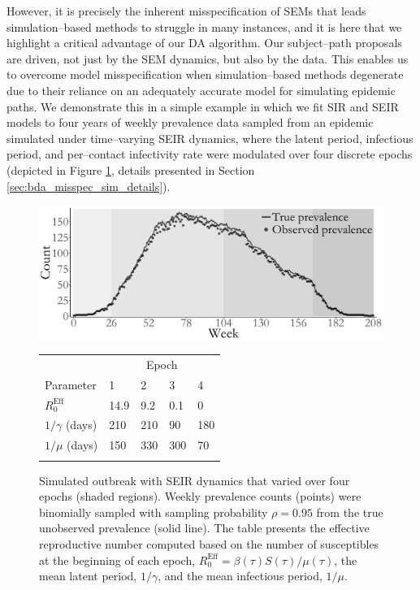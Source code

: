 However, it is precisely the inherent misspecification of SEMs that leads simulation--based methods to struggle in many instances, and it is here that we highlight a critical advantage of our DA algorithm. Our subject--path proposals are driven, not just by the SEM dynamics, but also by the data. This enables us to overcome model misspecification when simulation--based methods degenerate due to their reliance on an adequately accurate model for simulating epidemic paths. We demonstrate this in a simple example in which we fit SIR and SEIR models to four years of weekly prevalence data sampled from an epidemic simulated under time--varying SEIR dynamics, where the latent period, infectious period, and per--contact infectivity rate were modulated over four discrete epochs (depicted in Figure \ref{fig:misspec_data}, details presented in Section \ref{sec:bda_misspec_sim_details}).

\setcounter{table}{1}
\begin{figure}[!ht]
	\centering
	\includegraphics[width=0.5\linewidth]{figures/SEIR_misspec_data.pdf}
	\qquad
	\begin{tabular}[b]{lllll}
		& \multicolumn{4}{c}{Epoch}\\ \cmidrule{2-5}
		Parameter & 1 & 2 & 3 & 4 \\ \hline	
		$ R_0^{\mathrm{Eff}} $ & 14.9& 9.2& 0.1& 0\\
		$ 1/\gamma $ (days) & 210&210&90& 180\\
		$ 1/\mu $ (days) & 150 &330&300&70	\\
		&&&&
	\end{tabular}
	\captionsetup{labelformat=andtable}
	\caption{Simulated outbreak with SEIR dynamics that varied over four epochs (shaded regions). Weekly prevalence counts (points) were binomially sampled with sampling probability $ \rho = 0.95 $ from the true unobserved prevalence (solid line). The table presents the effective reproductive number computed based on the number of susceptibles at the beginning of each epoch, $ R_0^{\mathrm{Eff}} = \beta(\tau) S(\tau) / \mu(\tau) $, the mean latent period, $ 1/\gamma $, and the mean infectious period, $ 1/\mu $.}
	\label{fig:misspec_data}
\end{figure}

